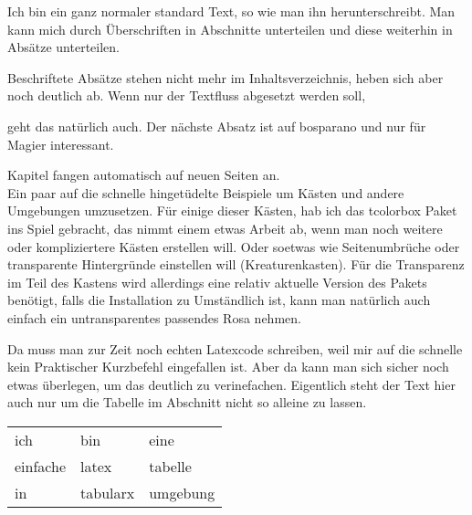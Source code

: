 \documentclass{Ilaris}
\begin{document}
\anfang
{}
\inhaltsverzeichnis
{}
\hauptteil
{}
\spaltenanfang
{}

Ich bin ein ganz normaler standard Text, so wie man ihn herunterschreibt. Man kann mich durch Überschriften in Abschnitte unterteilen und diese weiterhin in Absätze unterteilen.

Beschriftete Absätze stehen nicht mehr im Inhaltsverzeichnis, heben sich aber noch deutlich ab. Wenn nur der Textfluss abgesetzt werden soll,

geht das natürlich auch. Der nächste Absatz ist auf bosparano und nur für Magier interessant.

\lipsum[1-4]

Kapitel fangen automatisch auf neuen Seiten an.\\
Ein paar auf die schnelle hingetüdelte Beispiele um Kästen und andere Umgebungen umzusetzen. Für einige dieser Kästen, hab ich das tcolorbox Paket ins Spiel gebracht, das nimmt einem etwas Arbeit ab, wenn man noch weitere oder kompliziertere Kästen erstellen will. Oder soetwas wie Seitenumbrüche oder transparente Hintergründe einstellen will (Kreaturenkasten). Für die Transparenz im Teil des Kastens wird allerdings eine relativ aktuelle Version des Pakets benötigt, falls die Installation zu Umständlich ist, kann man natürlich auch einfach ein untransparentes passendes Rosa nehmen.

Da muss man zur Zeit noch echten Latexcode schreiben, weil mir auf die schnelle kein Praktischer Kurzbefehl eingefallen ist. Aber da kann man sich sicher noch etwas überlegen, um das deutlich zu verinefachen. Eigentlich steht der Text hier auch nur um die Tabelle im Abschnitt nicht so alleine zu lassen.\\

\begin{tabularx}{\linewidth}{X X X}
    ich      & bin      & eine     \\
    einfache & latex    & tabelle  \\
    in       & tabularx & umgebung \\
\end{tabularx}
\end{document}
